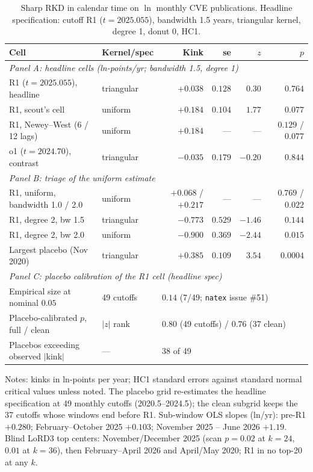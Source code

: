 \documentclass[11pt]{article}
\newcommand{\natex}{\texttt{natex}}
\begin{document}
\begin{table}[t]
\centering
\small
\caption{Sharp RKD in calendar time on $\ln$ monthly CVE publications.
Headline specification: cutoff R1 ($t=2025.055$), bandwidth 1.5 years,
triangular kernel, degree 1, donut 0, HC1.}
\label{tab:kink}
\setlength{\tabcolsep}{4.5pt}
\begin{tabular}{llrrrr}
\toprule
Cell & Kernel/spec & Kink & se & $z$ & $p$ \\
\midrule
\multicolumn{6}{l}{\emph{Panel A: headline cells (ln-points/yr; bandwidth 1.5, degree 1)}}\\
R1 ($t=2025.055$), headline & triangular & $+0.038$ & $0.128$ & $0.30$ & $0.764$ \\
R1, scout's cell            & uniform    & $+0.184$ & $0.104$ & $1.77$ & $0.077$ \\
R1, Newey--West (6 / 12 lags) & uniform  & $+0.184$ & --- & --- & $0.129$ / $0.077$ \\
o1 ($t=2024.70$), contrast  & triangular & $-0.035$ & $0.179$ & $-0.20$ & $0.844$ \\
\midrule
\multicolumn{6}{l}{\emph{Panel B: triage of the uniform estimate}}\\
R1, uniform, bandwidth 1.0 / 2.0 & uniform & $+0.068$ / $+0.217$ & --- & --- & $0.769$ / $0.022$ \\
R1, degree 2, bw 1.5             & triangular & $-0.773$ & $0.529$ & $-1.46$ & $0.144$ \\
R1, degree 2, bw 2.0             & uniform    & $-0.900$ & $0.369$ & $-2.44$ & $0.015$ \\
Largest placebo (Nov 2020)       & triangular & $+0.385$ & $0.109$ & $3.54$ & $0.0004$ \\
\midrule
\multicolumn{6}{l}{\emph{Panel C: placebo calibration of the R1 cell (headline spec)}}\\
Empirical size at nominal $0.05$ & 49 cutoffs & \multicolumn{4}{l}{$0.14$ (7/49; \natex{} issue \#51)} \\
Placebo-calibrated $p$, full / clean & $|z|$ rank & \multicolumn{4}{l}{$0.80$ (49 cutoffs) / $0.76$ (37 clean)} \\
Placebos exceeding observed $|$kink$|$ & --- & \multicolumn{4}{l}{38 of 49} \\
\bottomrule
\end{tabular}

\medskip
\parbox{0.95\textwidth}{\footnotesize Notes: kinks in ln-points per year;
HC1 standard errors against standard normal critical values unless noted.
The placebo grid re-estimates the headline specification at 49 monthly
cutoffs (2020.5--2024.5); the clean subgrid keeps the 37 cutoffs whose
windows end before R1. Sub-window OLS slopes (ln/yr): pre-R1 $+0.280$;
February--October 2025 $+0.103$; November 2025 -- June 2026 $+1.19$.
Blind LoRD3 top centers: November/December 2025 (scan $p=0.02$ at $k=24$,
$0.01$ at $k=36$), then February--April 2026 and April/May 2020; R1 in no
top-20 at any $k$.}
\end{table}
\end{document}
